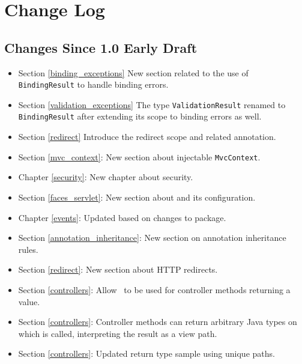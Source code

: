 \chapter{Change Log}

\section{Changes Since 1.0 Early Draft}

\begin{itemize}
\item Section \ref{binding_exceptions} New section related to the use of {\tt BindingResult}
to handle binding errors.
\item Section \ref{validation_exceptions} The type {\tt ValidationResult} renamed to 
{\tt BindingResult} after extending its scope to binding errors as well. 
\item Section \ref{redirect} Introduce the redirect scope and related annotation.
\item Section \ref{mvc_context}: New section about injectable {\tt MvcContext}.
\item Chapter \ref{security}: New chapter about security.
\item Section \ref{faces_servlet}: New section about  and its configuration.
\item Chapter \ref{events}: Updated based on changes to  package.
\item Section \ref{annotation_inheritance}: New section on annotation inheritance rules.
\item Section \ref{redirect}: New section about HTTP redirects.
\item Section \ref{controllers}: Allow \View\ to be used for controller methods returning a 
 value. 
\item Section \ref{controllers}: Controller methods can return arbitrary Java types on which 
 is called, interpreting the result as a view path.
\item Section \ref{controllers}: Updated return type sample using unique paths.
\end{itemize}
